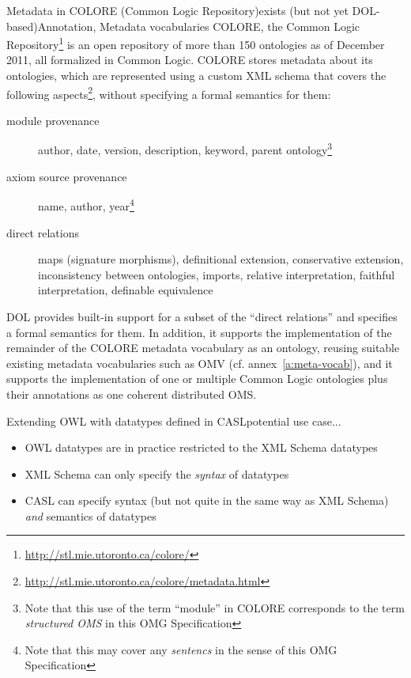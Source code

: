 \documentclass[10pt,%
\ifpretendfinal
final%
\else
draft%
\fi,
]{scrreprt}
\makeatletter
\newcommand*{\cf}{cf.\@\xspace}
\newcommand*{\termref}[1]{\textit{#1}}
\newcommand*{\IS}{OMG Specification\xspace}
\newcommand{\annexrefname}{annex}
\newcommand{\aref}[1]{\annexrefname~\ref{#1}}
\makeatother
\begin{document}
\begin{usecase}{Metadata in COLORE (Common Logic Repository)}{exists (but not yet DOL-based)}{Annotation, Metadata vocabularies}
  COLORE, the Common Logic Repository\footnote{\url{http://stl.mie.utoronto.ca/colore/}} is an open repository of more than 150 ontologies as of December 2011, all formalized in Common Logic.  COLORE stores metadata about its ontologies, which are represented using a custom XML schema that covers the following aspects\footnote{\url{http://stl.mie.utoronto.ca/colore/metadata.html}}, without specifying a formal semantics for them:
  \begin{description}
  \item[module provenance] author, date, version, description, keyword, parent ontology\footnote{Note that this use of the term ``module'' in COLORE corresponds
to the term \termref{structured OMS} in this \IS}
  \item[axiom source provenance] name, author, year\footnote{Note that this may cover any \termref{sentencs} in the sense of this \IS}
  \item[direct relations] maps (signature morphisms), definitional extension, conservative extension, inconsistency between ontologies, imports, relative interpretation, faithful interpretation, definable equivalence
  \end{description}

  DOL provides built-in support for a subset of the ``direct relations'' and specifies a formal semantics for them.  In addition, it supports the implementation of  the remainder of the COLORE metadata vocabulary as an ontology, reusing suitable existing metadata vocabularies such as OMV (\cf \aref{a:meta-vocab}), and it supports the implementation of one or multiple Common Logic ontologies plus their annotations as one coherent distributed OMS.
\end{usecase}

\begin{usecase}{Extending OWL with datatypes defined in CASL}{potential use case}{...}
  \begin{itemize}
  \item OWL datatypes are in practice restricted to the XML Schema datatypes
  \item XML Schema can only specify the \emph{syntax} of datatypes
  \item CASL can specify syntax (but not quite in the same way as XML Schema) \emph{and} semantics of datatypes
  \end{itemize}
\end{usecase}
\end{document}
